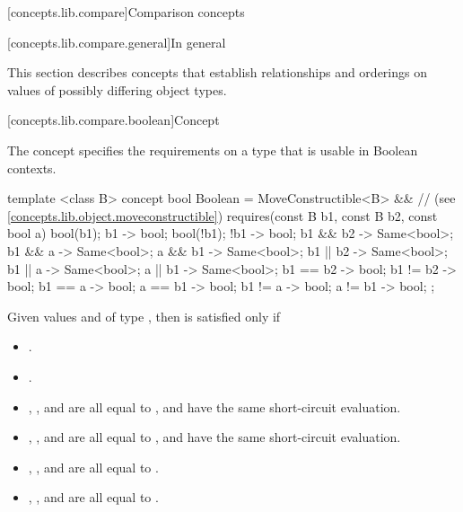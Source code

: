 [concepts.lib.compare]{Comparison concepts}

[concepts.lib.compare.general]{In general}

\pnum
This section describes concepts that establish relationships and orderings
on values of possibly differing object types.

[concepts.lib.compare.boolean]{Concept }

\pnum
The  concept specifies the requirements on a type that is usable in Boolean contexts.

%
\begin{itemdecl}
template <class B>
concept bool Boolean =
  MoveConstructible<B> && // (see \ref{concepts.lib.object.moveconstructible})
  requires(const B b1, const B b2, const bool a) {
    bool(b1);
    { b1 } -> bool;
    bool(!b1);
    { !b1 } -> bool;
    { b1 && b2 } -> Same<bool>;
    { b1 && a } -> Same<bool>;
    { a && b1 } -> Same<bool>;
    { b1 || b2 } -> Same<bool>;
    { b1 || a } -> Same<bool>;
    { a || b1 } -> Same<bool>;
    { b1 == b2 } -> bool;
    { b1 != b2 } -> bool;
    { b1 == a } -> bool;
    { a == b1 } -> bool;
    { b1 != a } -> bool;
    { a != b1 } -> bool;
  };
\end{itemdecl}

\pnum
Given values  and  of type , then
 is satisfied only if

\begin{itemize}
\item {}.
\item {}.
\item {}, , and
       are all equal to
      , and have the same short-circuit evaluation.
\item {}, , and
       are all equal to
      , and have the same short-circuit evaluation.
\item {}, , and
       are all equal to .
\item {}, , and
       are all equal to .
\end{itemize}

